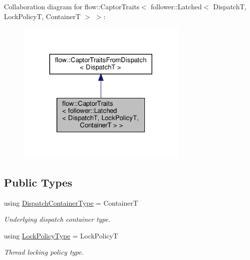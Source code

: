 Collaboration diagram for flow\+:\+:Captor\+Traits$<$ follower\+:\+:Latched$<$ DispatchT, Lock\+PolicyT, ContainerT $>$ $>$\+:\nopagebreak
\begin{figure}[H]
\begin{center}
\leavevmode
\includegraphics[width=236pt]{structflow_1_1_captor_traits_3_01follower_1_1_latched_3_01_dispatch_t_00_01_lock_policy_t_00_01_b52b96650456e7f978c8f411027cfb59}
\end{center}
\end{figure}
\subsection*{Public Types}
\begin{DoxyCompactItemize}
\item 
\mbox{\label{structflow_1_1_captor_traits_3_01follower_1_1_latched_3_01_dispatch_t_00_01_lock_policy_t_00_01_container_t_01_4_01_4_a683e18639ce41cdde597fb0f07f985e7}} 
using \hyperlink{structflow_1_1_captor_traits_3_01follower_1_1_latched_3_01_dispatch_t_00_01_lock_policy_t_00_01_container_t_01_4_01_4_a683e18639ce41cdde597fb0f07f985e7}{Dispatch\+Container\+Type} = ContainerT
\begin{DoxyCompactList}\small\item\em Underlying dispatch container type. \end{DoxyCompactList}\item 
\mbox{\label{structflow_1_1_captor_traits_3_01follower_1_1_latched_3_01_dispatch_t_00_01_lock_policy_t_00_01_container_t_01_4_01_4_acd12c9dc520003a589583f88a04e92ed}} 
using \hyperlink{structflow_1_1_captor_traits_3_01follower_1_1_latched_3_01_dispatch_t_00_01_lock_policy_t_00_01_container_t_01_4_01_4_acd12c9dc520003a589583f88a04e92ed}{Lock\+Policy\+Type} = Lock\+PolicyT
\begin{DoxyCompactList}\small\item\em Thread locking policy type. \end{DoxyCompactList}\end{DoxyCompactItemize}


